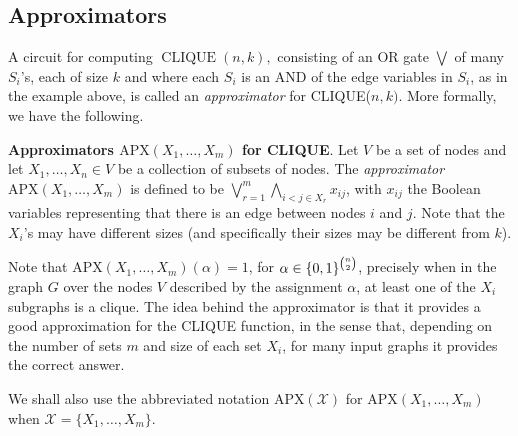 \newcommand{\APPX}{\ensuremath{\mathrm{APX}}}



\subsection{Approximators}

A  circuit for computing $\operatorname{CLIQUE}  (n, k),$ consisting of an OR gate $\bigvee$ of many  $S_i$'s, each of size $k$ and where each $S_i$ is an AND of the edge variables in $S_i$, as in the example above, is called an \textit{approximator} for CLIQUE($n, k)$. More formally, we have the following. 


\begin{tcolorbox}[colframe=white, colback=red!5, boxrule=0mm, sharp corners]
\textbf{Approximators $\APPX\left(X_1, \ldots, X_m\right)$ for CLIQUE}.
Let $V$ be a set of nodes and let $X_1,\dots,X_n\in V$ be a collection of subsets of nodes. The \emph{approximator} $\APPX\left(X_1, \ldots, X_m\right)$ is defined to be 
$\bigvee_{r=1}^m\bigwedge_{i<j \in X_r} x_{ij}$, with $x_{ij}$ the Boolean variables representing that there is an edge between nodes $i$ and $j$.
Note that the $X_i$'s may have different sizes (and specifically their sizes may be different from $k$).
\end{tcolorbox}
 
Note that $\APPX\left(X_1, \ldots, X_m\right)(\alpha)=1$, for $\alpha\in\{0,1\}^{n\choose 2}$, precisely when in the graph $G$ over the nodes $V$ described by the assignment $\alpha$, at least one of the $X_i$ subgraphs is a clique. The idea behind the approximator is that it provides a good approximation for the CLIQUE function, in the sense that, depending on the number of sets $m$ and size of each set $X_i$, for many  input graphs it provides the correct answer.   

We shall also use the abbreviated notation $\APPX(\mathcal X)$ for $\APPX(X_1,\dots,X_m)$ when $\mathcal X = \{X_1,\dots,X_m\}$.


